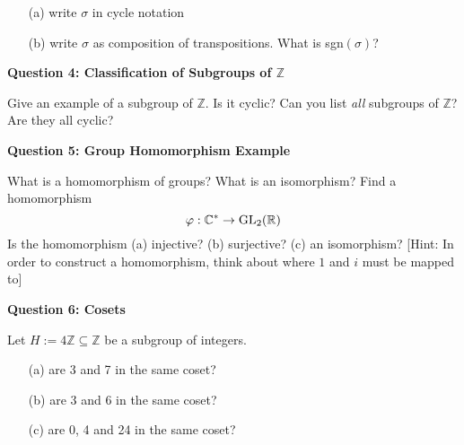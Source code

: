 \documentclass[11pt,twoside, a4paper]{report}
\theoremstyle{plain}
\theoremstyle{definition}
\begin{document}
  \begin{itemize}
  \item[(a)] write $\sigma$ in cycle notation
  \item[(b)] write $\sigma$ as composition of transpositions. What is sgn$(\sigma)$?
  \end{itemize}


\begin{center}
{\bf Question 4: Classification of Subgroups of $\mathbb{Z}$}
\end{center}

Give an example of a subgroup of $\mathbb{Z}$. Is it cyclic? Can you list \emph{all} subgroups of $\mathbb{Z}$? Are they all cyclic?

\begin{center}
{\bf Question 5: Group Homomorphism Example}
\end{center}

What is a homomorphism of groups? What is an isomorphism? Find a homomorphism 
$$\varphi: \mathbb{C}^{*} \rightarrow \textnormal{GL}_{2}(\mathbb{R})$$
Is the homomorphism (a) injective? (b) surjective? (c) an isomorphism? [Hint: In order to construct a homomorphism, think about where $1$ and $i$ must be mapped to]

\begin{center}
{\bf Question 6: Cosets}
\end{center}

Let $H:=4\mathbb{Z} \subseteq \mathbb{Z}$ be a subgroup of integers. 

\begin{itemize}
\item[(a)] are 3 and 7 in the same coset? 
\item[(b)] are 3 and 6 in the same coset?
\item[(c)] are 0, 4 and 24 in the same coset?
\end{itemize}



\end{document}
